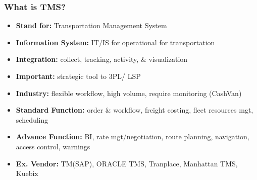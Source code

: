 \documentclass[10pt,handout,notes=show]{beamer}
\begin{document}
\begin{frame}
  \frametitle{What is TMS?}

  \begin{itemize}
    \item \textbf{Stand for:} \alert{Transportation} Management System
    \item \textbf{Information System:} IT/IS for operational for transportation
    \item \textbf{Integration:} collect, tracking, activity, \& \alert{visualization}
    \item \textbf{Important:} strategic tool to 3PL/ LSP
    \item \textbf{Industry:} flexible workflow, high volume, require monitoring (CashVan)
    \item \textbf{Standard Function:} order \& workflow, freight costing, fleet resources mgt, scheduling
    \item \textbf{Advance Function:} BI, rate mgt/negotiation, route planning, navigation, access control, warnings
    \item \textbf{Ex. Vendor:} TM(SAP),  ORACLE TMS, Tranplace,  Manhattan TMS, Kuebix
  \end{itemize}


\end{frame}
\end{document}
